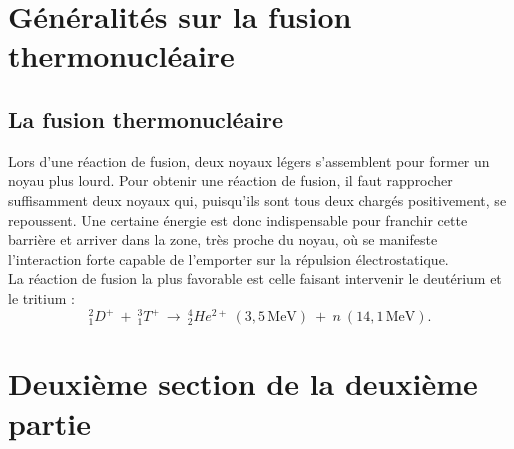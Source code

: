 \section{Généralités sur la fusion thermonucléaire}
\subsection{La fusion thermonucléaire}
Lors d'une réaction de fusion, deux noyaux légers s'assemblent pour former un noyau plus lourd. Pour obtenir une réaction de fusion, il faut rapprocher suffisamment deux noyaux qui, puisqu'ils sont tous deux chargés positivement, se repoussent. Une certaine énergie est donc indispensable pour franchir cette barrière et arriver dans la zone, très proche du noyau, où se manifeste l'interaction forte capable de l'emporter sur la répulsion électrostatique.
\\ %
La réaction de fusion la plus favorable est celle faisant intervenir le deutérium et le tritium : $$_{1}^{2}D^{+}~+~_{1}^{3}T^{+}~\rightarrow ~_{2}^{4}He^{2+}~(3,5\,\textrm{MeV})~+~n~(14,1\,\textrm{MeV}).$$
\noindent %
\lipsum[1]
\section{Deuxième section de la deuxième partie}
\lipsum[1]